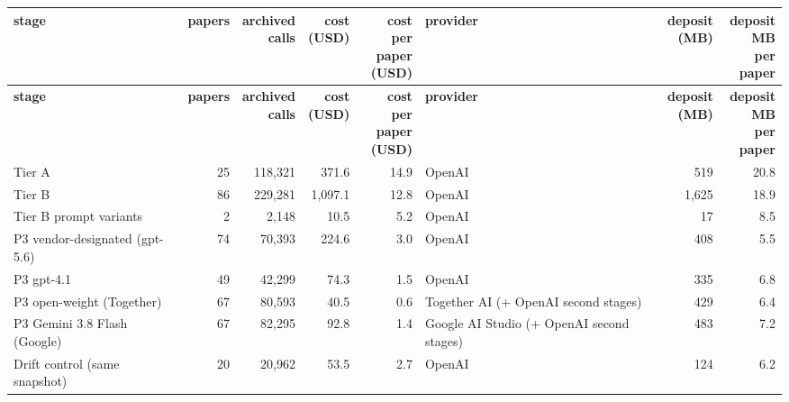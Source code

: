 \begingroup\scriptsize\setlength{\tabcolsep}{1.5pt}\renewcommand{\arraystretch}{1.08}
\begin{longtable}{>{\raggedright\arraybackslash}p{25mm}rrrr>{\raggedright\arraybackslash}p{24mm}rr}
\toprule
\textbf{stage} & \textbf{papers} & \shortstack[r]{\textbf{archived}\\\textbf{calls}} & \shortstack[r]{\textbf{cost}\\\textbf{(USD)}} & \shortstack[r]{\textbf{cost per}\\\textbf{paper}\\\textbf{(USD)}} & \textbf{provider} & \shortstack[r]{\textbf{deposit}\\\textbf{(MB)}} & \shortstack[r]{\textbf{deposit}\\\textbf{MB per}\\\textbf{paper}} \\
\midrule
\endfirsthead
\toprule
\textbf{stage} & \textbf{papers} & \shortstack[r]{\textbf{archived}\\\textbf{calls}} & \shortstack[r]{\textbf{cost}\\\textbf{(USD)}} & \shortstack[r]{\textbf{cost per}\\\textbf{paper}\\\textbf{(USD)}} & \textbf{provider} & \shortstack[r]{\textbf{deposit}\\\textbf{(MB)}} & \shortstack[r]{\textbf{deposit}\\\textbf{MB per}\\\textbf{paper}} \\
\midrule
\endhead
\bottomrule
\endfoot
Tier A & 25 & 118,321 & 371.6 & 14.9 & OpenAI & 519 & 20.8 \\
Tier B & 86 & 229,281 & 1,097.1 & 12.8 & OpenAI & 1,625 & 18.9 \\
Tier B prompt variants & 2 & 2,148 & 10.5 & 5.2 & OpenAI & 17 & 8.5 \\
P3 vendor-\allowbreak{}designated (gpt-\allowbreak{}5.6) & 74 & 70,393 & 224.6 & 3.0 & OpenAI & 408 & 5.5 \\
P3 gpt-\allowbreak{}4.1 & 49 & 42,299 & 74.3 & 1.5 & OpenAI & 335 & 6.8 \\
P3 open-\allowbreak{}weight (Together) & 67 & 80,593 & 40.5 & 0.6 & Together AI (+ OpenAI second stages) & 429 & 6.4 \\
P3 Gemini 3.8 Flash (Google) & 67 & 82,295 & 92.8 & 1.4 & Google AI Studio (+ OpenAI second stages) & 483 & 7.2 \\
Drift control (same snapshot) & 20 & 20,962 & 53.5 & 2.7 & OpenAI & 124 & 6.2 \\

\end{longtable}
